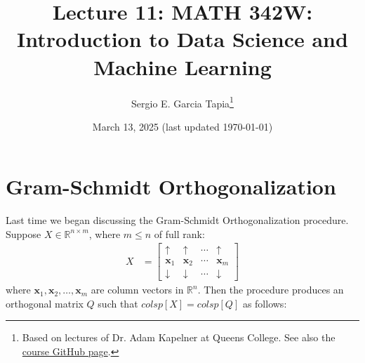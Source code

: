 \documentclass[12pt, a4paper]{article}
\title{Lecture 11: MATH 342W: Introduction to Data Science and Machine Learning}
\author{Sergio E. Garcia Tapia\thanks{Based on lectures of Dr. Adam Kapelner at Queens College.
See also the \href{https://github.com/kapelner/QC_MATH_342W_Spring_2025}{course GitHub page}.}}
\date{March 13, 2025 (last updated \today)}
\theoremstyle{definition}
\begin{document}
	\maketitle
	\section*{Gram-Schmidt Orthogonalization}
	Last time we began discussing the Gram-Schmidt Orthogonalization procedure.
	Suppose $X\in \mathbb{R}^{n\times m}$, where $m\leq n$ of full rank:
	\begin{align*}
		X &= \begin{bmatrix}
			\uparrow & \uparrow & \cdots & \uparrow\\
			\mathbf{x}_1 & \mathbf{x}_2 & \cdots & \mathbf{x}_m\\
			\downarrow & \downarrow & \cdots & \downarrow
		\end{bmatrix}
	\end{align*}
	where $\mathbf{x}_1,\mathbf{x}_2,\ldots,\mathbf{x}_m$ are column vectors
	in $\mathbb{R}^{n}$. Then the procedure produces an orthogonal matrix $Q$ such
	that $colsp[X] = colsp[Q]$ as follows:
\end{document}
